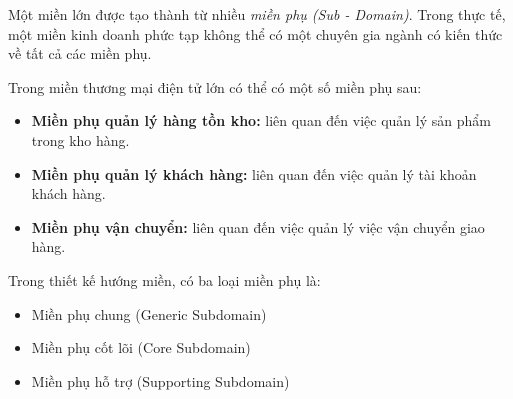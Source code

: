 










Một miền lớn được tạo thành từ nhiều \emph{miền phụ (Sub - Domain)}. Trong thực tế, một miền kinh doanh phức tạp không thể có một chuyên gia ngành có kiến thức về tất cả các miền phụ.

\begin{example} Trong miền thương mại điện tử lớn có thể có một số miền phụ sau:

\begin{itemize}

\item \textbf{Miền phụ quản lý hàng tồn kho:} liên quan đến việc quản lý sản phẩm trong kho hàng.

\item \textbf{Miền phụ quản lý khách hàng:} liên quan đến việc quản lý tài khoản khách hàng.

\item \textbf{Miền phụ vận chuyển:} liên quan đến việc quản lý việc vận chuyển giao hàng.

\end{itemize}

\end{example}


Trong thiết kế hướng miền, có ba loại miền phụ là:

\begin{itemize}

\item Miền phụ chung (Generic Subdomain)

\item Miền phụ cốt lõi (Core Subdomain)

\item Miền phụ hỗ trợ (Supporting Subdomain)

\end{itemize}

